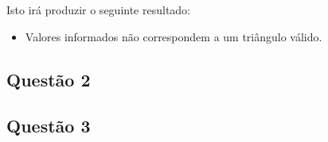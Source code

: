 	Isto irá produzir o seguinte resultado:

	\begin{itemize}
  	\item Valores informados não correspondem a um triângulo válido.
	\end{itemize}

\subsection{Questão 2}


\subsection{Questão 3}
